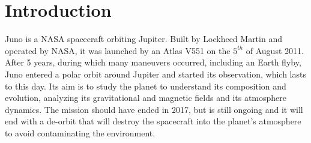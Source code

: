 \section{Introduction}
\label{sec:introduction}

Juno is a NASA spacecraft orbiting Jupiter. Built by Lockheed Martin and operated by NASA, it was launched by an Atlas V551 on the $5^{th}$ of August 2011. After 5 years, during which many maneuvers occurred, including an Earth flyby, Juno entered a polar orbit around Jupiter and started its observation, which lasts to this day. Its aim is to study the planet to understand its composition and evolution, analyzing its gravitational and magnetic fields and its atmosphere dynamics. The mission should have ended in 2017, but is still ongoing and it will end with a de-orbit that will destroy the spacecraft into the planet's atmosphere to avoid contaminating the environment.